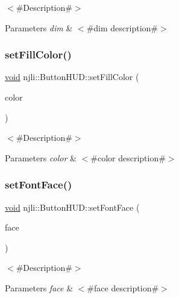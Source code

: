 $<$\#\+Description\#$>$


\begin{DoxyParams}{Parameters}
{\em dim} & $<$\#dim description\#$>$ \\
\hline
\end{DoxyParams}
\mbox{\label{classnjli_1_1_button_h_u_d_a845ff0e5328fe156aff8d20e90b04602}} 
\subsubsection{\texorpdfstring{set\+Fill\+Color()}{setFillColor()}}
{\footnotesize\ttfamily \mbox{\hyperlink{_thread_8h_af1e856da2e658414cb2456cb6f7ebc66}{void}} njli\+::\+Button\+H\+U\+D\+::set\+Fill\+Color (\begin{DoxyParamCaption}\item[{const bt\+Vector4 \&}]{color }\end{DoxyParamCaption})}

$<$\#\+Description\#$>$


\begin{DoxyParams}{Parameters}
{\em color} & $<$\#color description\#$>$ \\
\hline
\end{DoxyParams}
\mbox{\label{classnjli_1_1_button_h_u_d_a3b92a6bd18407b356492489408317fbf}} 
\subsubsection{\texorpdfstring{set\+Font\+Face()}{setFontFace()}}
{\footnotesize\ttfamily \mbox{\hyperlink{_thread_8h_af1e856da2e658414cb2456cb6f7ebc66}{void}} njli\+::\+Button\+H\+U\+D\+::set\+Font\+Face (\begin{DoxyParamCaption}\item[{const char $\ast$}]{face }\end{DoxyParamCaption})}

$<$\#\+Description\#$>$


\begin{DoxyParams}{Parameters}
{\em face} & $<$\#face description\#$>$ \\
\hline
\end{DoxyParams}
\mbox{\label{classnjli_1_1_button_h_u_d_ab43182f8de5edb34d84d0284acb0e909}} 
